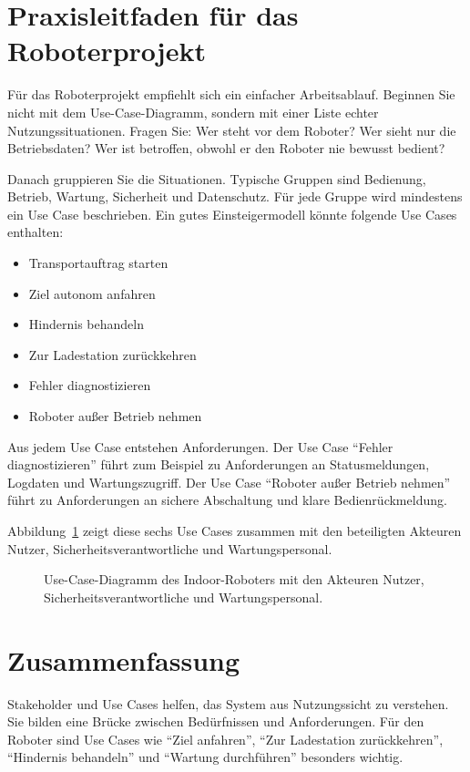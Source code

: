 \section{Praxisleitfaden für das Roboterprojekt}
Für das Roboterprojekt empfiehlt sich ein einfacher Arbeitsablauf. Beginnen Sie nicht mit dem Use-Case-Diagramm, sondern mit einer Liste echter Nutzungssituationen. Fragen Sie: Wer steht vor dem Roboter? Wer sieht nur die Betriebsdaten? Wer ist betroffen, obwohl er den Roboter nie bewusst bedient?

Danach gruppieren Sie die Situationen. Typische Gruppen sind Bedienung, Betrieb, Wartung, Sicherheit und Datenschutz. Für jede Gruppe wird mindestens ein Use Case beschrieben. Ein gutes Einsteigermodell könnte folgende Use Cases enthalten:

\begin{itemize}
    \item Transportauftrag starten
    \item Ziel autonom anfahren
    \item Hindernis behandeln
    \item Zur Ladestation zurückkehren
    \item Fehler diagnostizieren
    \item Roboter außer Betrieb nehmen
\end{itemize}

Aus jedem Use Case entstehen Anforderungen. Der Use Case \enquote{Fehler diagnostizieren} führt zum Beispiel zu Anforderungen an Statusmeldungen, Logdaten und Wartungszugriff. Der Use Case \enquote{Roboter außer Betrieb nehmen} führt zu Anforderungen an sichere Abschaltung und klare Bedienrückmeldung.

Abbildung~\ref{fig:kap07-usecase-diagramm} zeigt diese sechs Use Cases zusammen mit den beteiligten Akteuren Nutzer, Sicherheitsverantwortliche und Wartungspersonal.

\begin{figure}[H]
  \centering
  \caption{Use-Case-Diagramm des Indoor-Roboters mit den Akteuren Nutzer, Sicherheitsverantwortliche und Wartungspersonal.}
  \label{fig:kap07-usecase-diagramm}
\end{figure}

\section{Zusammenfassung}
Stakeholder und Use Cases helfen, das System aus Nutzungssicht zu verstehen. Sie bilden eine Brücke zwischen Bedürfnissen und Anforderungen. Für den Roboter sind Use Cases wie \enquote{Ziel anfahren}, \enquote{Zur Ladestation zurückkehren}, \enquote{Hindernis behandeln} und \enquote{Wartung durchführen} besonders wichtig.

